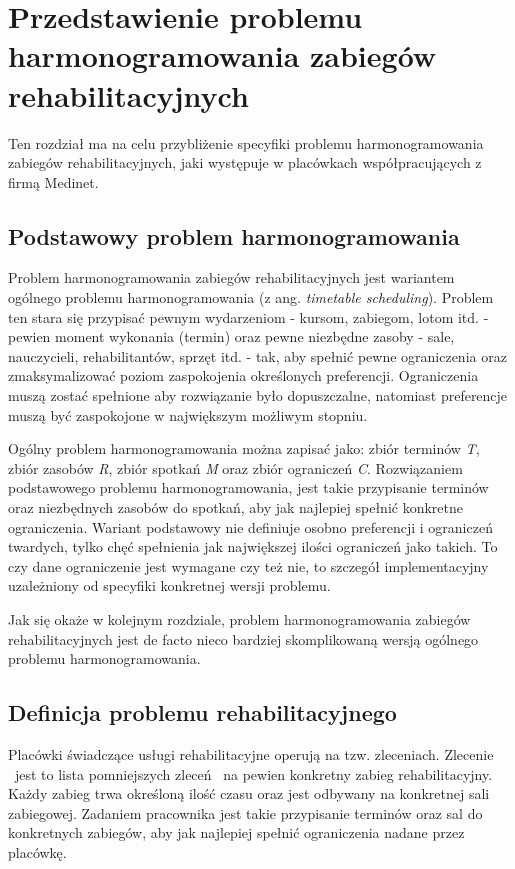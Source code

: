 \chapter{Przedstawienie problemu harmonogramowania zabiegów rehabilitacyjnych}
Ten rozdział ma na celu przybliżenie specyfiki problemu harmonogramowania zabiegów
rehabilitacyjnych, jaki występuje w placówkach współpracujących z firmą Medinet.

\section{Podstawowy problem harmonogramowania}
Problem harmonogramowania zabiegów rehabilitacyjnych jest wariantem ogólnego problemu
harmonogramowania (z ang. \emph{timetable scheduling}). Problem ten  stara się
przypisać pewnym wydarzeniom - kursom, zabiegom, lotom itd. - pewien moment
wykonania (termin) oraz pewne niezbędne zasoby - sale, nauczycieli,
rehabilitantów, sprzęt itd. - tak, aby spełnić pewne ograniczenia oraz
zmaksymalizować poziom zaspokojenia określonych preferencji. Ograniczenia muszą
zostać spełnione aby rozwiązanie było dopuszczalne, natomiast preferencje muszą
być zaspokojone w największym możliwym stopniu.

Ogólny problem harmonogramowania można zapisać \cite{timetableProblem2} jako:
zbiór terminów \emph{T}, zbiór zasobów \emph{R}, zbiór spotkań \emph{M} oraz
zbiór ograniczeń \emph{C}. Rozwiązaniem podstawowego problemu harmonogramowania,
jest takie przypisanie terminów oraz niezbędnych zasobów do spotkań, aby jak
najlepiej spełnić konkretne ograniczenia. Wariant podstawowy nie definiuje
osobno preferencji i ograniczeń twardych, tylko chęć spełnienia jak największej ilości ograniczeń
jako takich. To czy dane ograniczenie jest wymagane czy też nie, to szczegół
implementacyjny uzależniony od specyfiki konkretnej wersji problemu.

Jak się okaże w kolejnym rozdziale, problem harmonogramowania zabiegów
rehabilitacyjnych jest de facto nieco bardziej skomplikowaną wersją ogólnego
problemu harmonogramowania.
\pagebreak
\section{Definicja problemu rehabilitacyjnego}
Placówki świadczące usługi rehabilitacyjne operują na tzw. zleceniach. Zlecenie
\sRef\ jest to lista pomniejszych zleceń \sSubRef\ na pewien konkretny zabieg rehabilitacyjny.
Każdy zabieg trwa określoną ilość czasu oraz jest odbywany na konkretnej sali
zabiegowej. Zadaniem pracownika jest takie przypisanie terminów oraz sal do konkretnych
zabiegów, aby jak najlepiej spełnić ograniczenia nadane przez placówkę.

